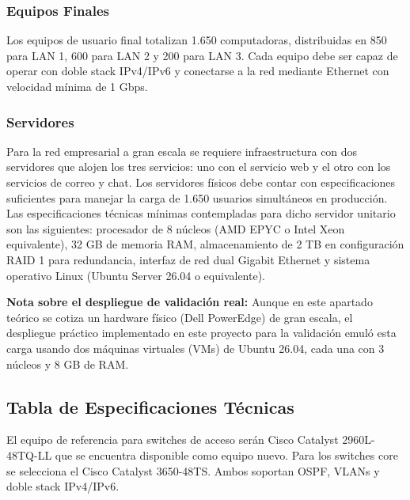 \subsubsection{Equipos Finales}

Los equipos de usuario final totalizan 1.650 computadoras, distribuidas en
850 para LAN 1, 600 para LAN 2 y 200 para LAN 3. Cada equipo debe ser capaz
de operar con doble stack IPv4/IPv6 y conectarse a la red mediante Ethernet
con velocidad mínima de 1 Gbps.

\subsubsection{Servidores}

Para la red empresarial a gran escala se requiere infraestructura con dos servidores que alojen los tres servicios: uno con el servicio web y el otro con los servicios de correo y chat. Los servidores físicos debe contar con especificaciones suficientes para manejar la carga de 1.650 usuarios simultáneos en producción. Las especificaciones técnicas mínimas contempladas para dicho servidor unitario son las siguientes: procesador de 8 núcleos (AMD EPYC o Intel Xeon equivalente), 32 GB de memoria RAM, almacenamiento de 2 TB en configuración RAID 1 para redundancia, interfaz de red dual Gigabit Ethernet y sistema operativo Linux (Ubuntu Server 26.04  o equivalente).

\textbf{Nota sobre el despliegue de validación real:} Aunque en este apartado teórico se cotiza un hardware físico (Dell PowerEdge) de gran escala, el despliegue práctico implementado en este proyecto para la validación emuló esta carga usando dos máquinas virtuales (VMs) de Ubuntu 26.04, cada una con 3 núcleos y 8 GB de RAM.

\subsection{Tabla de Especificaciones Técnicas}

El equipo de referencia para switches de acceso serán 
Cisco Catalyst 2960L-48TQ-LL que se encuentra disponible como equipo nuevo.
Para los switches core se selecciona el Cisco Catalyst 3650-48TS. Ambos soportan OSPF, VLANs y doble stack
IPv4/IPv6.

